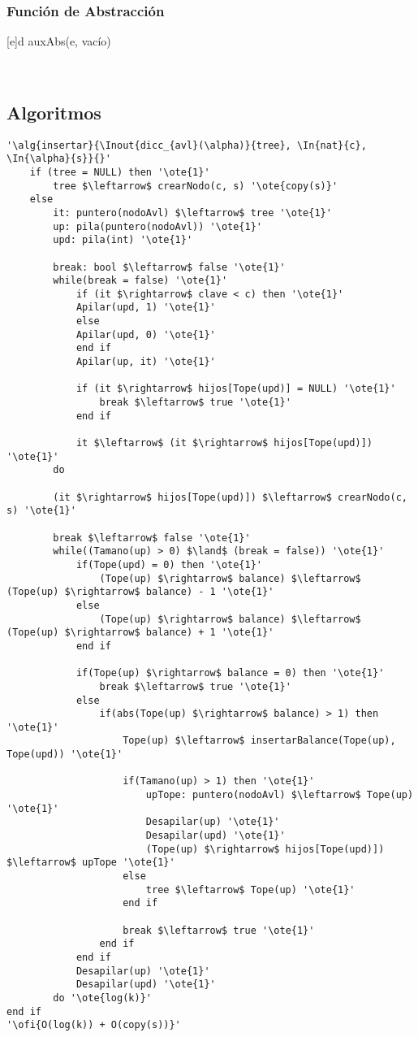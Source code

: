 	\subsubsection{Función de Abstracción}
	  {d}{
		auxAbs(e, vacío)
	}

	~


\subsection{Algoritmos}

\begin{lstlisting}[mathescape]
'\alg{insertar}{\Inout{dicc_{avl}(\alpha)}{tree}, \In{nat}{c}, \In{\alpha}{s}}{}'
	if (tree = NULL) then '\ote{1}'
		tree $\leftarrow$ crearNodo(c, s) '\ote{copy(s)}'
	else
		it: puntero(nodoAvl) $\leftarrow$ tree '\ote{1}'
		up: pila(puntero(nodoAvl)) '\ote{1}'
		upd: pila(int) '\ote{1}'

		break: bool $\leftarrow$ false '\ote{1}'
		while(break = false) '\ote{1}'
			if (it $\rightarrow$ clave < c)	then '\ote{1}'
			Apilar(upd, 1) '\ote{1}'
			else
			Apilar(upd, 0) '\ote{1}'
			end if
			Apilar(up, it) '\ote{1}'

			if (it $\rightarrow$ hijos[Tope(upd)] = NULL) '\ote{1}'
				break $\leftarrow$ true '\ote{1}'
			end if

			it $\leftarrow$ (it $\rightarrow$ hijos[Tope(upd)]) '\ote{1}'
		do

		(it $\rightarrow$ hijos[Tope(upd)]) $\leftarrow$ crearNodo(c, s) '\ote{1}'

		break $\leftarrow$ false '\ote{1}'
		while((Tamano(up) > 0) $\land$ (break = false)) '\ote{1}'
			if(Tope(upd) = 0) then '\ote{1}'
				(Tope(up) $\rightarrow$ balance) $\leftarrow$ (Tope(up)	$\rightarrow$ balance) - 1 '\ote{1}'
			else
				(Tope(up) $\rightarrow$ balance) $\leftarrow$ (Tope(up)	$\rightarrow$ balance) + 1 '\ote{1}'
			end if

			if(Tope(up) $\rightarrow$ balance = 0) then '\ote{1}'
				break $\leftarrow$ true '\ote{1}'
			else
				if(abs(Tope(up) $\rightarrow$ balance) > 1) then '\ote{1}'
					Tope(up) $\leftarrow$ insertarBalance(Tope(up), Tope(upd)) '\ote{1}'

					if(Tamano(up) > 1) then '\ote{1}'
						upTope: puntero(nodoAvl) $\leftarrow$ Tope(up) '\ote{1}'
						Desapilar(up) '\ote{1}'
						Desapilar(upd) '\ote{1}'
						(Tope(up) $\rightarrow$ hijos[Tope(upd)]) $\leftarrow$ upTope '\ote{1}'
					else
						tree $\leftarrow$ Tope(up) '\ote{1}'
					end if

					break $\leftarrow$ true '\ote{1}'
				end if
			end if
			Desapilar(up) '\ote{1}'
			Desapilar(upd) '\ote{1}'
		do '\ote{log(k)}'
end if
'\ofi{O(log(k)) + O(copy(s))}'
\end{lstlisting}

